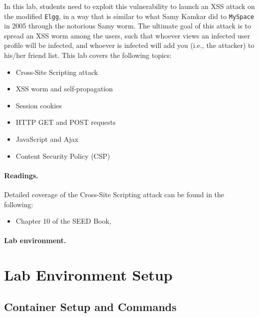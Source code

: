 In this lab, students need to exploit this vulnerability to 
launch an XSS attack on the modified {\tt Elgg}, in a way that is 
similar to what Samy Kamkar
did to {\tt MySpace} in 2005 through the notorious Samy worm. 
The ultimate goal of this attack is to spread an XSS worm among the users,
such that whoever views an infected user profile will be infected,
and whoever is infected will add you (i.e., the attacker) to 
his/her friend list. This lab covers the following topics:

\begin{itemize}[noitemsep]
 \item Cross-Site Scripting attack
 \item XSS worm and self-propagation 
 \item Session cookies
 \item HTTP GET and POST requests
 \item JavaScript and Ajax
 \item Content Security Policy (CSP) 
\end{itemize}


\paragraph{Readings.}
Detailed coverage of the Cross-Site Scripting attack can be found in the following:

\begin{itemize}
\item Chapter 10 of the SEED Book, \seedbook
\end{itemize}


\paragraph{Lab environment.} \seedenvironmentB





\section{Lab Environment Setup}


\subsection{Container Setup and Commands}

